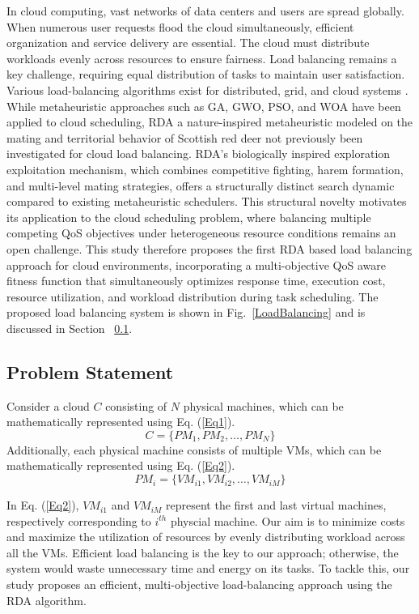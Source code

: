 \documentclass[pdflatex,sn-mathphys-num]{sn-jnl}%
\begin{document}
In cloud computing, vast networks of data centers and users are spread globally. 
When numerous user requests flood the cloud simultaneously, efficient organization 
and service delivery are essential. The cloud must distribute workloads evenly 
across resources to ensure fairness. Load balancing remains a key challenge, 
requiring equal distribution of tasks to maintain user satisfaction. Various 
load-balancing algorithms exist for distributed, grid, and cloud systems 
\cite{JinchengLoadBalancing}. While metaheuristic approaches such as GA, GWO, 
PSO, and WOA have been applied to cloud scheduling, RDA a nature-inspired metaheuristic modeled on the mating and 
territorial behavior of Scottish red deer not previously 
been investigated for cloud load balancing. RDA's biologically inspired 
exploration exploitation mechanism, which combines competitive fighting, harem 
formation, and multi-level mating strategies, offers a structurally distinct 
search dynamic compared to existing metaheuristic schedulers. This structural 
novelty motivates its application to the cloud scheduling problem, where 
balancing multiple competing QoS objectives under heterogeneous resource 
conditions remains an open challenge. This study therefore proposes the first 
RDA based load balancing approach for cloud environments, 
incorporating a multi-objective QoS aware fitness function that simultaneously 
optimizes response time, execution cost, resource utilization, and workload 
distribution during task scheduling. The proposed load balancing system is shown in Fig.~\ref{LoadBalancing} and is discussed in Section ~\ref{subsec3.1}.


\subsection{Problem Statement}\label{subsec3.1}
Consider a cloud $C$ consisting of $N$ physical machines, which can be mathematically represented using Eq. (\ref{Eq1}).
\begin{equation}
C = \{PM_1, PM_2,\ldots,PM_N\}
\label{Eq1}
\end{equation}
Additionally, each physical machine consists of multiple VMs, which can be mathematically represented using Eq. (\ref{Eq2}).
\begin{equation}
PM_i = \{VM_{i1}, VM_{i2},\ldots,VM_{iM}\}
\label{Eq2}
\end{equation}

In Eq. (\ref{Eq2}), $VM_{i1}$ and $VM_{iM}$ represent the first and last virtual machines, respectively corresponding to $i^{th}$  physcial machine. Our aim is to minimize costs and maximize the utilization of resources by evenly distributing workload across all the VMs. Efficient load balancing is the key to our approach; otherwise, the system would waste unnecessary time and energy on its tasks. To tackle this, our study proposes an efficient, multi-objective load-balancing approach using the RDA algorithm.
\end{document}
